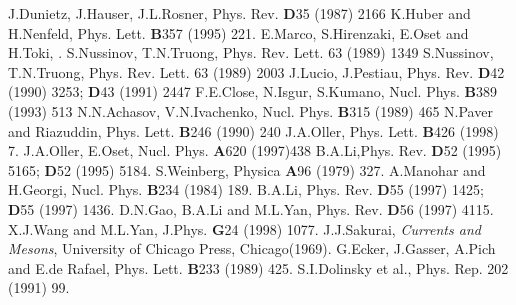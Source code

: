 \newpage
\begin{thebibliography}{99}
 J.Dunietz, J.Hauser, J.L.Rosner, Phys. Rev. {\bf D}35 (1987)
2166
 K.Huber and H.Nenfeld, Phys. Lett. {\bf B}357 (1995) 221.
 E.Marco, S.Hirenzaki, E.Oset and H.Toki, .
 S.Nussinov, T.N.Truong, Phys. Rev. Lett. 63 (1989) 1349   
 S.Nussinov, T.N.Truong, Phys. Rev. Lett. 63 (1989) 2003
 J.Lucio, J.Pestiau, Phys. Rev. {\bf D}42 (1990) 3253; {\bf
             D}43 (1991) 2447
 F.E.Close, N.Isgur, S.Kumano, Nucl. Phys. {\bf B}389 (1993)
513
 N.N.Achasov, V.N.Ivachenko, Nucl. Phys. {\bf B}315 (1989) 465
 N.Paver and Riazuddin, Phys. Lett. {\bf B}246 (1990) 240
 J.A.Oller, Phys. Lett. {\bf B}426 (1998) 7.
 J.A.Oller, E.Oset, Nucl. Phys. {\bf A}620 (1997)438
 B.A.Li,Phys. Rev. {\bf D}52 (1995) 5165; {\bf D}52 (1995)
5184.
S.Weinberg, Physica {\bf A}96 (1979) 327.
 A.Manohar and H.Georgi, Nucl. Phys. {\bf B}234 (1984) 189.
 B.A.Li, Phys. Rev. {\bf D}55 (1997) 1425; {\bf
D}55 (1997) 1436.
D.N.Gao, B.A.Li and M.L.Yan, Phys. Rev. {\bf D}56 (1997)
4115.
X.J.Wang and M.L.Yan, J.Phys. {\bf G}24 (1998) 1077.
J.J.Sakurai, {\sl Currents and Mesons}, University of Chicago
            Press, Chicago(1969).
G.Ecker, J.Gasser, A.Pich and E.de Rafael, Phys. Lett. {\bf
B}233 (1989) 425.
S.I.Dolinsky et al., Phys. Rep. 202 (1991) 99.
\end{thebibliography}

 

